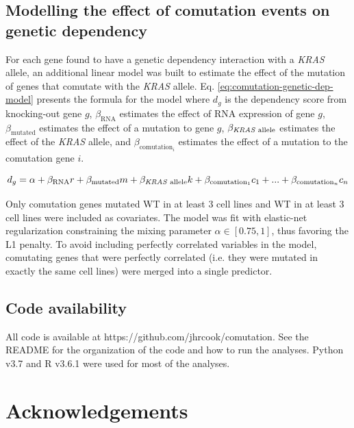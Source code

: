 \documentclass[english, 10pt, letterpaper]{article}
\newcommand{\KRAS}{\emph{KRAS}}
\begin{document}
\subsection*{Modelling the effect of comutation events on genetic dependency}

For each gene found to have a genetic dependency interaction with a \KRAS{} allele, an additional linear model was built to estimate the effect of the mutation of genes that comutate with the \KRAS{} allele.
Eq. \ref{eq:comutation-genetic-dep-model} presents the formula for the model where $d_g$ is the dependency score from knocking-out gene $g$, $\beta_{\text{RNA}}$ estimates the effect of RNA expression of gene $g$, $\beta_{\text{mutated}}$ estimates the effect of a mutation to gene $g$, $\beta_{\text{\KRAS{} allele}}$ estimates the effect of the \KRAS{} allele, and $\beta_{\text{comutation}_i}$ estimates the effect of a mutation to the comutation gene $i$.

\begin{equation}
\label{eq:comutation-genetic-dep-model}
d_g = \alpha + \beta_{\text{RNA}}r +\beta_{\text{mutated}}m + \beta_{\text{\KRAS{} allele}}k + \beta_{\text{comutation}_1}c_1 + ... + \beta_{\text{comutation}_n}c_n
\end{equation}

Only comutation genes mutated WT in at least 3 cell lines and WT in at least 3 cell lines were included as covariates.
The model was fit with elastic-net regularization \cite{Zou2005RegularizationNet} constraining the mixing parameter $\alpha \in [0.75, 1]$, thus favoring the L1 penalty.
To avoid including perfectly correlated variables in the model, comutating genes that were perfectly correlated (i.e. they were mutated in exactly the same cell lines) were merged into a single predictor.


\subsection*{Code availability}

All code is available at https://github.com/jhrcook/comutation.
See the README for the organization of the code and how to run the analyses.
Python v3.7 \cite{van1995python} and R v3.6.1 \cite{Rlang} were used for most of the analyses.



\section*{Acknowledgements}
\end{document}
